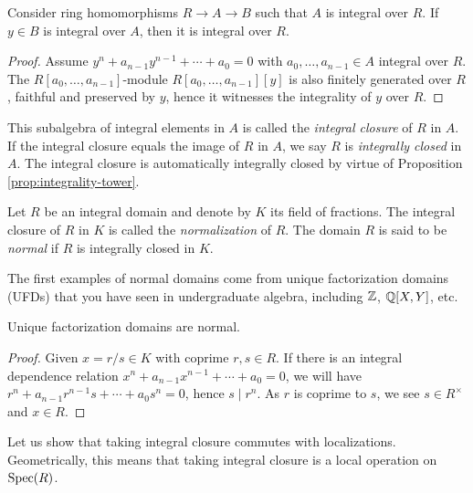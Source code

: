 \begin{proposition}\label{prop:integrality-tower}
	Consider ring homomorphisms $R \to A \to B$ such that $A$ is integral over $R$. If $y \in B$ is integral over $A$, then it is integral over $R$. 
\end{proposition}
\begin{proof}
	Assume $y^n + a_{n-1} y^{n-1} + \cdots + a_0 = 0$ with $a_0, \ldots, a_{n-1} \in A$ integral over $R$. The $R[a_0, \ldots, a_{n-1}]$-module $R[a_0, \ldots, a_{n-1}][y]$ is also finitely generated over $R$, faithful and preserved by $y$, hence it witnesses the integrality of $y$ over $R$.
\end{proof}

This subalgebra of integral elements in $A$ is called the \emph{integral closure} of $R$ in $A$. If the integral closure equals the image of $R$ in $A$, we say $R$ is \emph{integrally closed} in $A$. The integral closure is automatically integrally closed by virtue of Proposition \ref{prop:integrality-tower}.

\begin{definition}
	Let $R$ be an integral domain and denote by $K$ its field of fractions. The integral closure of $R$ in $K$ is called the \emph{normalization} of $R$. The domain $R$ is said to be \emph{normal} if $R$ is integrally closed in $K$.
\end{definition}

The first examples of normal domains come from unique factorization domains (UFDs) that you have seen in undergraduate algebra, including $\mathbb{Z}$, $\mathbb{Q}[X,Y]$, etc.

\begin{proposition}
	Unique factorization domains are normal.
\end{proposition}
\begin{proof}
	Given $x = r/s \in K$ with coprime $r,s \in R$. If there is an integral dependence relation $x^n + a_{n-1} x^{n-1} + \cdots + a_0 = 0$, we will have $r^n + a_{n-1} r^{n-1}s + \cdots + a_0 s^n = 0$, hence $s \mid r^n$. As $r$ is coprime to $s$, we see $s \in R^\times$ and $x \in R$.
\end{proof}

Let us show that taking integral closure commutes with localizations. Geometrically, this means that taking integral closure is a local operation on $\operatorname{Spec}(R)$.

